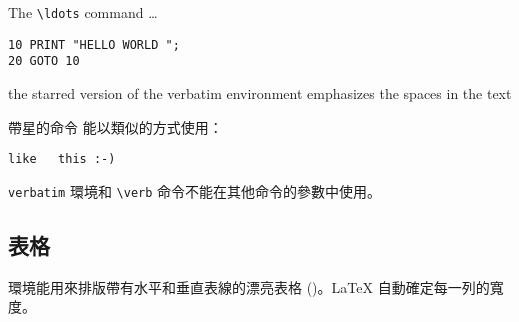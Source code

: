 \begin{example}
The \verb|\ldots| command \ldots
\begin{verbatim}
10 PRINT "HELLO WORLD ";
20 GOTO 10
\end{verbatim}
\end{example}

\begin{example}
\begin{verbatim*}
the starred version of
the      verbatim
environment emphasizes
the spaces   in the text
\end{verbatim*}
\end{example}

帶星的命令  能以類似的方式使用：

\begin{example}
\verb*|like   this :-) |
\end{example}

\texttt{verbatim} 環境和 \verb|\verb| 命令不能在其他命令的參數中使用。

%

\subsection{表格}

\newcommand{\mfr}[1]{\framebox{\rule{0pt}{0.7em}\texttt{#1}}}

 環境能用來排版帶有水平和垂直表線的漂亮表格 ()。\LaTeX{} 自動確定每一列的寬度。

